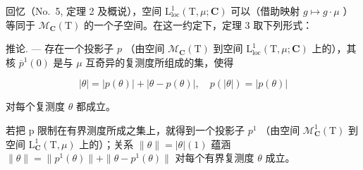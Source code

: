 回忆（No.~5, 定理 2 及概说），空间 \(\mathrm{L}_{\mathrm{loc}}^{1}(\mathrm{T},\mu;\mathbf{C})\) 可以（借助映射 \(g\mapsto g\cdot\mu\) ）等同于 \(\mathcal{M}_{\mathbf{C}}(\mathrm{T})\) 的一个子空间。在这一约定下，定理 3 取下列形式：

推论. --- 存在一个投影子 \(p\) （由空间 \(\mathcal{M}_{\mathbf{C}}(\mathrm{T})\) 到空间 \(\mathrm{L}_{\mathrm{loc}}^{1}(\mathrm{T},\mu ;\mathbf{C})\) 上的），其核 \(\overline{p}^{1}(0)\) 是与 \(\mu\) 互奇异的复测度所组成的集，使得

\[
| \theta | = | p (\theta) | + | \theta - p (\theta) |, \quad p (| \theta |) = | p (\theta) |
\]

对每个复测度 \(\theta\) 都成立。

若把 p 限制在有界测度所成之集上，就得到一个投影子 \(p^{1}\) （由空间 \(\mathcal{M}_{\mathbf{C}}^{1}(\mathrm{T})\) 到空间 \(\mathrm{L}_{\mathbf{C}}^{1}(\mathrm{T},\mu)\) 上的）；关系 \(\|\theta\|=|\theta|(1)\) 蕴涵 \(\|\theta\|=\|p^{1}(\theta)\|+\|\theta-p^{1}(\theta)\|\) 对每个有界复测度 \(\theta\) 成立。

